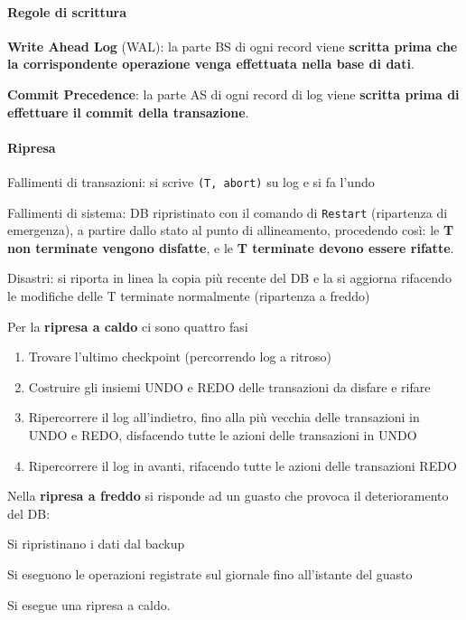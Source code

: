 \documentclass[10pt]{book}
\begin{document}
\paragraph{Regole di scrittura}
\begin{list}{}{}
	\item \textbf{Write Ahead Log} (WAL): la parte BS di ogni record viene \textbf{scritta prima che la corrispondente operazione venga effettuata nella base di dati}.
	\item \textbf{Commit Precedence}: la parte AS di ogni record di log viene \textbf{scritta prima di effettuare il commit della transazione}.
\end{list}
\paragraph{Ripresa}\begin{list}{}{}
	\item Fallimenti di transazioni: si scrive \texttt{(T, abort)} su log e si fa l'undo
	\item Fallimenti di sistema: DB ripristinato con il comando di \texttt{Restart} (ripartenza di emergenza), a partire dallo stato al punto di allineamento, procedendo così: le \textbf{T non terminate vengono disfatte}, e le \textbf{T terminate devono essere rifatte}.
	\item Disastri: si riporta in linea la copia più recente del DB e la si aggiorna rifacendo le modifiche delle T terminate normalmente (ripartenza a freddo)
\end{list}
Per la \textbf{ripresa a caldo} ci sono quattro fasi
\begin{enumerate}
	\item Trovare l'ultimo checkpoint (percorrendo log a ritroso)
	\item Costruire gli insiemi UNDO e REDO delle transazioni da disfare e rifare
	\item Ripercorrere il log all'indietro, fino alla più vecchia delle transazioni in UNDO e REDO, disfacendo tutte le azioni delle transazioni in UNDO
	\item Ripercorrere il log in avanti, rifacendo tutte le azioni delle transazioni REDO
\end{enumerate}
Nella \textbf{ripresa a freddo} si risponde ad un guasto che provoca il deterioramento del DB:
\begin{list}{}{}
	\item Si ripristinano i dati dal backup
	\item Si eseguono le operazioni registrate sul giornale fino all'istante del guasto
	\item Si esegue una ripresa a caldo.
\end{list}
\end{document}
